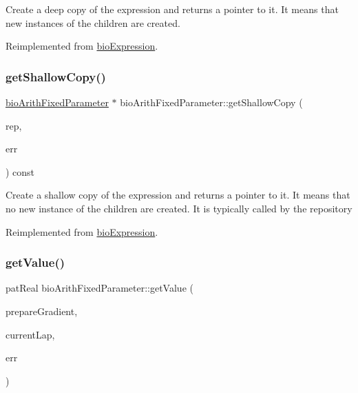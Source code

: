 Create a deep copy of the expression and returns a pointer to it. It means that new instances of the children are created. 

Reimplemented from \hyperlink{classbio_expression_a4ee1b8add634078a02eaae26cd40dcc8}{bio\+Expression}.

\mbox{\label{classbio_arith_fixed_parameter_a0743b72d00d4f769ec3c01faae8ebac8}} 
\subsubsection{\texorpdfstring{get\+Shallow\+Copy()}{getShallowCopy()}}
{\footnotesize\ttfamily \hyperlink{classbio_arith_fixed_parameter}{bio\+Arith\+Fixed\+Parameter} $\ast$ bio\+Arith\+Fixed\+Parameter\+::get\+Shallow\+Copy (\begin{DoxyParamCaption}\item[{\hyperlink{classbio_expression_repository}{bio\+Expression\+Repository} $\ast$}]{rep,  }\item[{pat\+Error $\ast$\&}]{err }\end{DoxyParamCaption}) const\hspace{0.3cm}{\ttfamily [virtual]}}

Create a shallow copy of the expression and returns a pointer to it. It means that no new instance of the children are created. It is typically called by the repository 

Reimplemented from \hyperlink{classbio_expression_a442534762693b92baaf33928979a1bf8}{bio\+Expression}.

\mbox{\label{classbio_arith_fixed_parameter_a0eed9a884a07681f00da9b42e559cd8c}} 
\subsubsection{\texorpdfstring{get\+Value()}{getValue()}}
{\footnotesize\ttfamily pat\+Real bio\+Arith\+Fixed\+Parameter\+::get\+Value (\begin{DoxyParamCaption}\item[{pat\+Boolean}]{prepare\+Gradient,  }\item[{pat\+U\+Long}]{current\+Lap,  }\item[{pat\+Error $\ast$\&}]{err }\end{DoxyParamCaption})\hspace{0.3cm}{\ttfamily [virtual]}}

